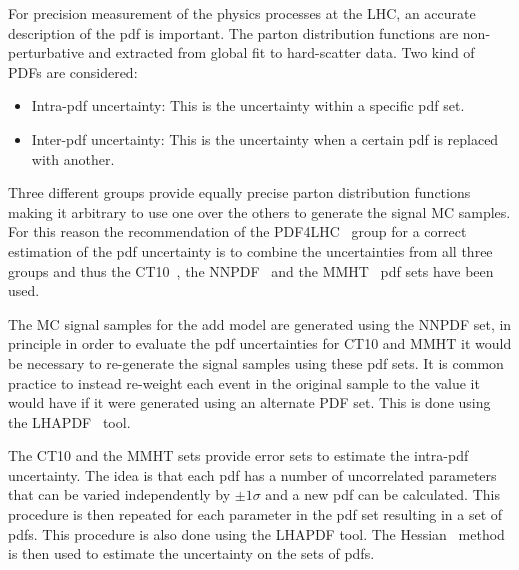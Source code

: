 For precision measurement of the physics processes at the LHC, an accurate
description of the \gls{pdf} is important. The parton distribution functions are
non-perturbative and extracted from global fit to hard-scatter data. Two kind of
PDFs are considered:
\begin{itemize}
\item Intra-\gls{pdf} uncertainty: This is the uncertainty within a specific \gls{pdf}
  set.
\item Inter-\gls{pdf} uncertainty: This is the uncertainty when a certain
  \gls{pdf} is replaced with another.
\end{itemize}
Three different groups provide equally precise parton distribution functions
making it arbitrary to use one over the others to generate the signal MC
samples. For this reason the recommendation of the PDF4LHC~\cite{PDF4LHC} group
for a correct estimation of the \gls{pdf} uncertainty is to combine the
uncertainties from all three groups and thus the CT10~\cite{CT10}, the
NNPDF~\cite{NNPDF} and the MMHT~\cite{MMHT} \gls{pdf} sets have been used.

The MC signal samples for the \gls{add} model are generated using the NNPDF set,
in principle in order to evaluate the \gls{pdf} uncertainties for CT10 and MMHT
it would be necessary to re-generate the signal samples using these \gls{pdf}
sets. It is common practice to instead re-weight each event in the original
sample to the value it would have if it were generated using an alternate PDF
set. This is done using the LHAPDF~\cite{LHAPDF} tool.

The CT10 and the MMHT sets provide error sets to estimate the intra-\gls{pdf}
uncertainty. The idea is that each \gls{pdf} has a number of uncorrelated
parameters that can be varied independently by $\pm 1\sigma$ and a new \gls{pdf}
can be calculated. This procedure is then repeated for each parameter in the
\gls{pdf} set resulting in a set of \glspl{pdf}. This procedure is also done
using the LHAPDF tool. The Hessian~\cite{Hessian} method is then used to
estimate the uncertainty on the sets of \glspl{pdf}.

